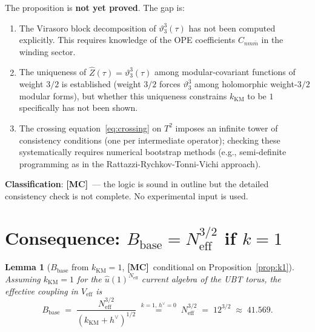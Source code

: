 \documentclass[12pt,a4paper]{article}
\newtheorem{lemma}[theorem]{Lemma}
\theoremstyle{definition}
\theoremstyle{remark}
\newcommand{\MC}{\textbf{[MC]}}
\newcommand{\vth}{\vartheta}
\begin{document}
\begin{tcolorbox}[colback=yellow!5!white,colframe=orange!60!black,
  title={Status of Proposition~\ref{prop:k1}: OPEN [MC]}]
The proposition is \textbf{not yet proved}.  The gap is:

\begin{enumerate}
  \item The Virasoro block decomposition of $\vth_3^3(\tau)$ has not been
        computed explicitly.  This requires knowledge of the OPE coefficients
        $C_{nm\bar{m}}$ in the winding sector.

  \item The uniqueness of $\hat{Z}(\tau) = \vth_3^3(\tau)$ among
        modular-covariant functions of weight $3/2$ is established (weight $3/2$
        forces $\vth_3^3$ among holomorphic weight-$3/2$ modular forms), but
        whether this uniqueness constrains $k_{\mathrm{KM}}$ to be $1$
        specifically has not been shown.

  \item The crossing equation~\eqref{eq:crossing} on $T^2$ imposes an
        infinite tower of consistency conditions (one per intermediate
        operator); checking these systematically requires numerical
        bootstrap methods (e.g., semi-definite programming as in the
        Rattazzi-Rychkov-Tonni-Vichi approach).
\end{enumerate}

\textbf{Classification}: \MC\ — the logic is sound in outline but the
detailed consistency check is not complete.  No experimental input is used.
\end{tcolorbox}

\section{Consequence: $B_{\mathrm{base}} = N_{\mathrm{eff}}^{3/2}$ if $k = 1$}
\label{sec:bbase}

\begin{lemma}[$B_{\mathrm{base}}$ from $k_{\mathrm{KM}} = 1$, \MC\ conditional on
  Proposition~\ref{prop:k1}]
\label{lem:bbase}
Assuming $k_{\mathrm{KM}} = 1$ for the $\hat{u}(1)^{N_{\mathrm{eff}}}$ current
algebra of the UBT torus, the effective coupling in $V_{\mathrm{eff}}$ is
\[
  B_{\mathrm{base}}
  \;=\;
  \frac{N_{\mathrm{eff}}^{3/2}}{(k_{\mathrm{KM}} + h^\vee)^{1/2}}
  \;\stackrel{k=1,\,h^\vee=0}{=}\;
  N_{\mathrm{eff}}^{3/2}
  \;=\;
  12^{3/2}
  \;\approx\;
  41.569.
\]
\end{lemma}
\end{document}
